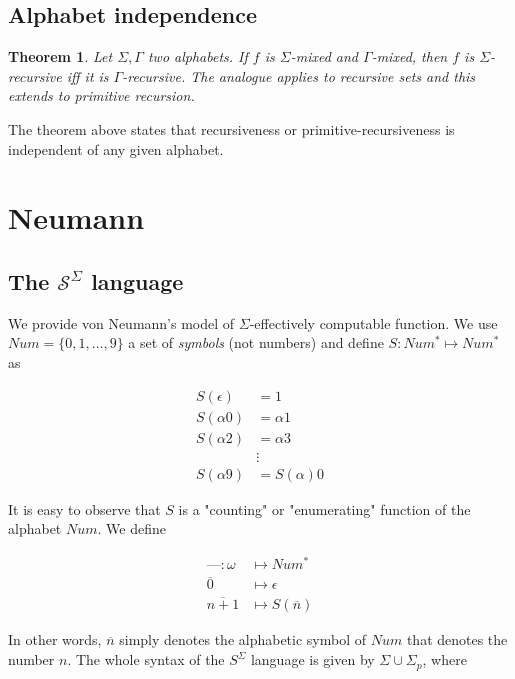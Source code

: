 \documentclass[a4paper, 12pt]{article}
\newtheorem{theorem}{Theorem}
\newtheorem{theorem}{Theorem}
\begin{document}
\subsection{Alphabet independence}

\begin{theorem} Let $\Sigma, \Gamma$ two alphabets. If $f$ is $\Sigma$-mixed and
$\Gamma$-mixed, then $f$ is $\Sigma$-recursive iff it is $\Gamma$-recursive. The
analogue applies to recursive sets and this extends to primitive recursion.
\end{theorem}

The theorem above states that recursiveness or primitive-recursiveness is
independent of any given alphabet.


\pagebreak 

\section{Neumann}

\subsection{The $\mathcal{S}^{\Sigma}$ language}

We provide von Neumann's model of $\Sigma$-effectively computable function. We
use $Num = \{0, 1, \ldots, 9\}$ a set of \textit{symbols} (not numbers) and
define $S : Num^{*} \mapsto Num^{*}$ as 

\begin{align*}
    S(\epsilon) &= 1 \\
    S(\alpha 0) &= \alpha 1 \\
    S(\alpha 2) &= \alpha 3 \\
                &\vdots \\ 
    S(\alpha 9) &= S(\alpha) 0
\end{align*}

It is easy to observe that $S$ is a "counting" or "enumerating" function of the
alphabet $Num$. We define 

\begin{align*}
    \text{---} : \omega &\mapsto  Num^{*}  \\ 
    \overline{0} & \mapsto \epsilon \\ 
    \overline{n + 1} &\mapsto S(\overline{n})
\end{align*}

In other words, $\overline{n}$ simply denotes the alphabetic symbol of $Num$
that denotes the number $n$. The whole syntax of the $S^{\Sigma}$ language is
given by $\Sigma \cup \Sigma_p$, where
\end{document}
